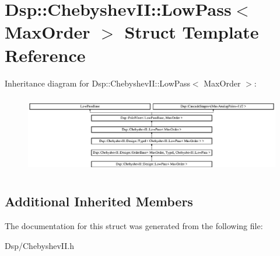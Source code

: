 \hypertarget{structDsp_1_1ChebyshevII_1_1LowPass}{\section{Dsp\-:\-:Chebyshev\-I\-I\-:\-:Low\-Pass$<$ Max\-Order $>$ Struct Template Reference}
\label{structDsp_1_1ChebyshevII_1_1LowPass}
}
Inheritance diagram for Dsp\-:\-:Chebyshev\-I\-I\-:\-:Low\-Pass$<$ Max\-Order $>$\-:\begin{figure}[H]
\begin{center}
\leavevmode
\includegraphics[height=3.442623cm]{structDsp_1_1ChebyshevII_1_1LowPass}
\end{center}
\end{figure}
\subsection*{Additional Inherited Members}


The documentation for this struct was generated from the following file\-:\begin{DoxyCompactItemize}
\item 
Dsp/Chebyshev\-I\-I.\-h\end{DoxyCompactItemize}
